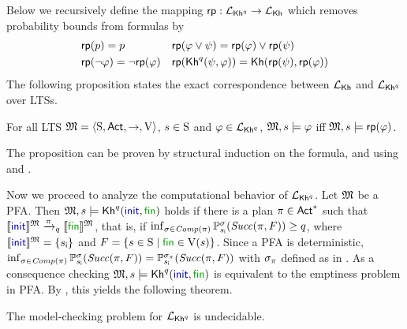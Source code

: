 Below we recursively define the mapping $\fgetprob:\PKh\to\Khlogic$ which removes probability bounds from formulas by
%
\begin{align*}
  & \fgetprob(p) = p
  && \fgetprob(\varphi \vee \psi) = \fgetprob(\varphi) \vee \fgetprob(\psi)\\
  & \fgetprob(\neg \varphi) = \neg \fgetprob(\varphi)
  && \fgetprob(\kh^q(\psi,\varphi)) = \kh(\fgetprob(\psi),\fgetprob(\varphi))
\end{align*}
%
The following proposition states the exact correspondence between
$\Khlogic$ and $\PKh$ over LTSs.
%
\begin{proposition}\label{prop:Kh:PKh}
    For all LTS $\model = \tup{\S,\Act,\ra,\V}$, $s\in\S$ and
    $\varphi\in\PKh$,
    $\model,s\models\varphi$ iff $\model,s\models\fgetprob(\varphi)$.
\end{proposition}

The proposition can be proven by structural induction on
the formula, and using
 and .

Now we proceed to analyze the computational behavior of $\PKh$. 
Let $\model$ be a PFA. Then $\model,s\models\kh^q(\init,\fin)$ holds
if there is a plan $\plan\in \Act^*$ such that
$\truthset{\model}{\init}\reach{\plan}_q\truthset{\model}{\fin}$, that
is, if
$\inf_{\strat\in\Comp(\plan)}\Prob^\strat_{\sini}(\Succ(\plan,F)) \geq q$,
where $\truthset{\model}{\init}=\{\sini\}$ and
$F=\{{s\in\S}\mid{\fin\in\V(s)}\}$.
%
Since a PFA is deterministic,
$\inf_{\strat\in\Comp(\plan)}\Prob^\strat_{\sini}(\Succ(\plan,F)) =
\Prob^{\strat_\plan}_{\sini}(\Succ(\plan,F))$
with $\strat_\plan$ defined as in .
%
As a consequence checking $\model,s\models\kh^q(\init,\fin)$ is
equivalent to the emptiness problem in PFA.  By
, this yields the following theorem.

\begin{theorem}\label{th:mc:PKh:undecidable}
  The model-checking problem for $\PKh$ is undecidable.
\end{theorem}

